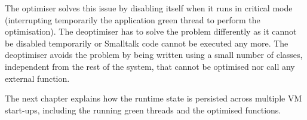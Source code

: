 \documentclass[a4paper,12pt,twoside]{../includes/ThesisStyle}
\begin{document}
The optimiser solves this issue by disabling itself when it runs in critical mode (interrupting temporarily the application green thread to perform the optimisation). %
The deoptimiser has to solve the problem differently as it cannot be disabled temporarily or Smalltalk code cannot be executed any more. The deoptimiser avoids the problem by being written using a small number of classes, independent from the rest of the system, that cannot be optimised nor call any external function.

The next chapter explains how the runtime state is persisted across multiple VM start-ups, including the running green threads and the optimised functions.

\ifx\wholebook\relax\else
    
\end{document}
